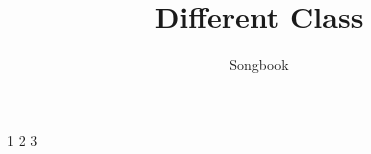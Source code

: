 \documentclass[14pt]{article}
\title{Different Class}
\author{Songbook}
\date{}                                           %
\newcommand{\p}[3]{
	#1 #2 #3
}
\newcommand{\tab}[1]{

	#1

}
\begin{document}
\maketitle

\newpage

\tableofcontents 
\newpage
\tab{\p{1}{2}{3}}




\end{document}

